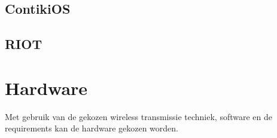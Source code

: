 \documentclass{../local}
\begin{document}
\subsection{ContikiOS}
\subsection{RIOT}


\section{Hardware}
Met gebruik van de gekozen wireless transmissie techniek, software en de requirements kan de hardware gekozen worden. 
%
\end{document}
